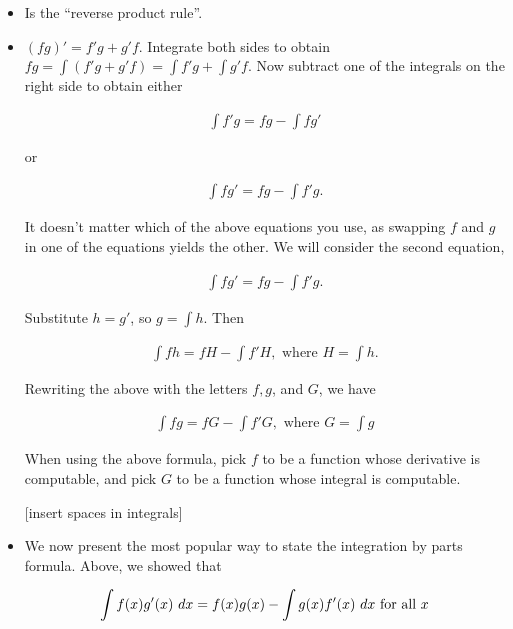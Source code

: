 \begin{itemize}
    \item Is the ``reverse product rule''.
    \item $(fg)' = f'g + g'f$. Integrate both sides to obtain $fg = \int (f'g + g'f) = \int f'g + \int g'f$. Now subtract one of the integrals on the right side to obtain either
    
    \begin{align*}
        \int f'g = fg - \int fg'
    \end{align*}
    
    or
    
    \begin{align*}
        \int fg' = fg - \int f'g.
    \end{align*}
    
    It doesn't matter which of the above equations you use, as swapping $f$ and $g$ in one of the equations yields the other. We will consider the second equation,
    
    \begin{align*}
        \int fg' = fg - \int f'g.
    \end{align*}
    
    Substitute $h = g'$, so $g = \int h$. Then
    
    \begin{align*}
        \int fh = fH - \int f'H, \text{ where } H = \int h.
    \end{align*}
    
    Rewriting the above with the letters $f, g$, and $G$, we have
    
    \begin{align*}
        \boxed
        {
            \int fg = fG - \int f'G, \text{ where } G = \int g
        }
    \end{align*}
    
    When using the above formula, pick $f$ to be a function whose derivative is computable, and pick $G$ to be a function whose integral is computable.
    
    [insert spaces in integrals]
    
    \item We now present the most popular way to state the integration by parts formula. Above, we showed that

    \begin{align*}
        \int f(x) g'(x) \text{ } dx = f(x) g(x) - \int g(x) f'(x) \text{ } dx \text{ for all $x$}
    \end{align*}


\end{itemize}
